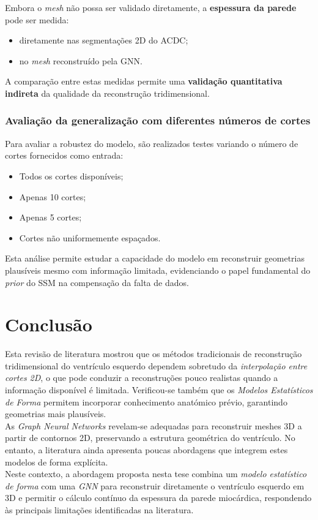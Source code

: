 \documentclass[12pt,a4paper]{report}
\begin{document}
Embora o \textit{mesh} não possa ser validado diretamente, a \textbf{espessura da parede} pode ser medida:

\begin{itemize}
    \item diretamente nas segmentações 2D do ACDC;
    \item no \textit{mesh} reconstruído pela GNN.
\end{itemize}

A comparação entre estas medidas permite uma \textbf{validação quantitativa indireta} da qualidade da reconstrução tridimensional.

\subsection*{Avaliação da generalização com diferentes números de cortes}

Para avaliar a robustez do modelo, são realizados testes variando o número de cortes fornecidos como entrada:

\begin{itemize}
    \item Todos os cortes disponíveis;
    \item Apenas 10 cortes;
    \item Apenas 5 cortes;
    \item Cortes não uniformemente espaçados.
\end{itemize}

Esta análise permite estudar a capacidade do modelo em reconstruir geometrias plausíveis mesmo com informação limitada, evidenciando o papel fundamental do \textit{prior} do SSM na compensação da falta de dados.

\chapter{Conclusão}

Esta revisão de literatura mostrou que os métodos tradicionais de reconstrução tridimensional do ventrículo esquerdo dependem sobretudo da \textit{interpolação entre cortes 2D}, o que pode conduzir a reconstruções pouco realistas quando a informação disponível é limitada. Verificou-se também que os \textit{Modelos Estatísticos de Forma} permitem incorporar conhecimento anatómico prévio, garantindo geometrias mais plausíveis.
\\

As \textit{Graph Neural Networks} revelam-se adequadas para reconstruir meshes 3D a partir de contornos 2D, preservando a estrutura geométrica do ventrículo. No entanto, a literatura ainda apresenta poucas abordagens que integrem estes modelos de forma explícita.
\\

Neste contexto, a abordagem proposta nesta tese combina um \textit{modelo estatístico de forma} com uma \textit{GNN} para reconstruir diretamente o ventrículo esquerdo em 3D e permitir o cálculo contínuo da espessura da parede miocárdica, respondendo às principais limitações identificadas na literatura.



\printbibliography
\end{document}
